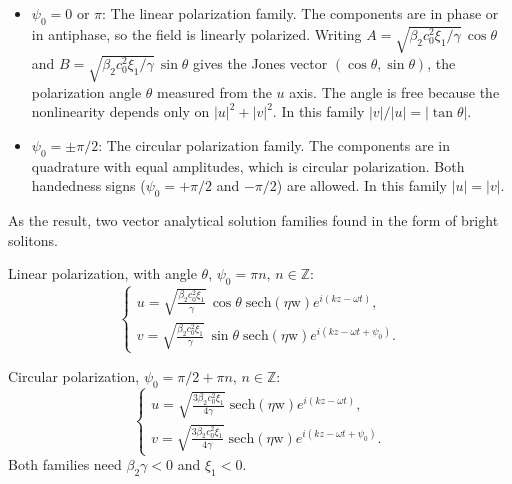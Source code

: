 \documentclass{article}
\begin{document}
            \begin{itemize}
                \item $\psi_{0}=0$ or $\pi$: The linear polarization family. The components are in phase or in antiphase, so the field is linearly polarized. Writing $A=\sqrt{\beta_2c_0^2\xi_1/\gamma}\,\cos\theta$ and $B=\sqrt{\beta_2c_0^2\xi_1/\gamma}\,\sin\theta$ gives the Jones vector $(\cos\theta,\sin\theta)$, the polarization angle $\theta$ measured from the $u$ axis. The angle is free because the nonlinearity depends only on $|u|^2+|v|^2$. In this family $|v|/|u| = |\tan\theta|$.
                \item $\psi_{0}=\pm\pi/2$: The circular polarization family. The components are in quadrature with equal amplitudes, which is circular polarization. Both handedness signs ($\psi_{0}=+\pi/2$ and $-\pi/2$) are allowed. In this family $|u|=|v|$.
            \end{itemize}

            As the result, two vector analytical solution families found in the form of bright solitons.

            Linear polarization, with angle $\theta$, \(\psi_{0}=\pi n, \, n \in \mathbb{Z}\):
            \begin{equation} \label{eq53}
                \begin{cases}
                    \displaystyle u = \sqrt{\frac{\beta_2c_0^2\xi_1}{\gamma}}\,\cos\theta\;\mathrm{sech}\left(\eta\mathrm{w}\right)e^{i\left(kz-\omega t\right)}, \\
                    \displaystyle v = \sqrt{\frac{\beta_2c_0^2\xi_1}{\gamma}}\,\sin\theta\;\mathrm{sech}\left(\eta\mathrm{w}\right)e^{i\left(kz-\omega t+\psi_{0}\right)}.
                \end{cases}
            \end{equation}

            Circular polarization, \(\psi_{0}=\pi/2 + \pi n, \, n \in \mathbb{Z}\):
            \begin{equation} \label{eq54}
                \begin{cases}
                    \displaystyle u = \sqrt{\frac{3\beta_2c_0^2\xi_1}{4\gamma}}\;\mathrm{sech}\left(\eta\mathrm{w}\right)e^{i\left(kz-\omega t\right)}, \\
                    \displaystyle v = \sqrt{\frac{3\beta_2c_0^2\xi_1}{4\gamma}}\;\mathrm{sech}\left(\eta\mathrm{w}\right)e^{i\left(kz-\omega t+\psi_{0}\right)}.
                \end{cases}
            \end{equation}
            Both families need $\beta_2\gamma<0$ and $\xi_1<0$.
\end{document}
